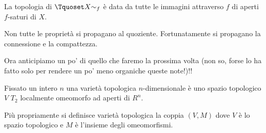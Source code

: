 \begin{prop}
La topologia di $\Tquoset X{\sim_f}$ è data da tutte le immagini attraverso $f$ di aperti $f$-saturi di $X$.
\end{prop}

\begin{oss} 
Non tutte le proprietà si propagano al quoziente. Fortunatamente si propagano la connessione e la compattezza.
\end{oss}





Ora anticipiamo un po' di quello che faremo la prossima volta (non so, forse lo ha fatto solo per rendere un po' meno organiche queste note!)!!

\marginpar{!!!!!!!!!!!!!!}

\begin{defn}
Fissato un intero $n$ una varietà topologica $n$-dimensionale è uno spazio topologico $V$ $T_2$ localmente omeomorfo ad aperti di $R^n$.

Più propriamente si definisce varietà topologica la coppia $(V, M)$ dove $V$ è lo spazio topologico e $M$ è l'insieme degli omeomorfismi.
\end{defn}
